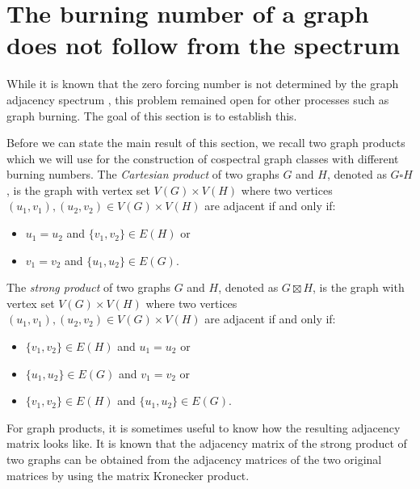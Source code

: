 \documentclass[12pt]{article}
\theoremstyle{plain}
\theoremstyle{definition}
\theoremstyle{remark}
\begin{document}
\section{The burning number of a graph does not follow from the spectrum}\label{sec:cospectralburning}

 While it is known that the zero forcing number is not determined by the graph adjacency spectrum \cite{aida-zero-forcing}, this problem remained open for other processes such as graph burning. The goal of this section is to establish this.




Before we can state the main result of this section, we recall two graph products which we will use for the construction of cospectral graph classes with different burning numbers.  The \textit{Cartesian product} of two graphs $G$ and $H$, denoted as $G\square H$, is the graph with vertex set $V(G)\times V(H)$ where two vertices $(u_1,v_1), (u_2,v_2)\in V(G)\times V(H)$ are adjacent if and only if:
    \begin{itemize}
        \item[1.] $u_1=u_2$ and $\{v_1,v_2\}\in E(H)$ or\\ \vspace{-.6cm}
        \item[2.] $v_1=v_2$ and $\{u_1,u_2\}\in E(G)$.
    \end{itemize}


 
The \textit{strong product} of two graphs $G$ and $H$, denoted as  $G\boxtimes H$, is the graph with vertex set $V(G)\times V(H)$ where two vertices $(u_1,v_1), (u_2,v_2)\in V(G)\times V(H)$ are adjacent if and only if:
    \begin{itemize}
        \item[1.] $\{v_1,v_2\}\in E(H)$ and $u_1=u_2$ or\\ \vspace{-.6cm}
        \item[2.] $\{u_1,u_2\}\in E(G)$ and $v_1=v_2$ or\\ \vspace{-.6cm}
        \item[3.] $\{v_1,v_2\}\in E(H)$ and $\{u_1,u_2\}\in E(G)$.
    \end{itemize}


For graph products, it is sometimes useful to know how the resulting adjacency matrix looks like. It is known that the adjacency matrix of the strong product of two graphs can be obtained from the adjacency matrices of the two original matrices by using the matrix Kronecker product.
\end{document}
